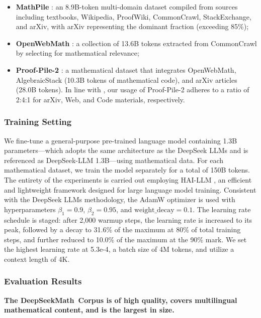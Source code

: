 \begin{itemize}[topsep=0pt]
\begin{itemize}[topsep=0pt]
    \item \textbf{MathPile} \citep{mathpile}: an 8.9B-token multi-domain dataset compiled from sources including textbooks, Wikipedia, ProofWiki, CommonCrawl, StackExchange, and arXiv, with arXiv representing the dominant fraction (exceeding 85\%);
    \item \textbf{OpenWebMath} \citep{openwebmath}: a collection of 13.6B tokens extracted from CommonCrawl by selecting for mathematical relevance;
    \item \textbf{Proof-Pile-2} \citep{llemma}: a mathematical dataset that integrates OpenWebMath, AlgebraicStack (10.3B tokens of mathematical code), and arXiv articles (28.0B tokens). In line with \cite{llemma}, our usage of Proof-Pile-2 adheres to a ratio of 2:4:1 for arXiv, Web, and Code materials, respectively.
\end{itemize}

\subsubsection{Training Setting}
\label{sec:quality-policy}
We fine-tune a general-purpose pre-trained language model containing 1.3B parameters—which adopts the same architecture as the DeepSeek LLMs \citep{deepseek-llm} and is referenced as DeepSeek-LLM 1.3B—using mathematical data. For each mathematical dataset, we train the model separately for a total of 150B tokens. The entirety of the experiments is carried out employing HAI-LLM \citep{haillm}, an efficient and lightweight framework designed for large language model training. Consistent with the DeepSeek LLMs methodology, the AdamW optimizer \citep{adamW} is used with hyperparameters $\beta_1=0.9$, $\beta_2=0.95$, and $\mathrm{weight\_decay}=0.1$. The learning rate schedule is staged: after 2,000 warmup steps, the learning rate is increased to its peak, followed by a decay to 31.6\% of the maximum at 80\% of total training steps, and further reduced to 10.0\% of the maximum at the 90\% mark. We set the highest learning rate at 5.3e-4, a batch size of 4M tokens, and utilize a context length of 4K.

\subsubsection{Evaluation Results}

\textbf{The DeepSeekMath~Corpus is of high quality, covers multilingual mathematical content, and is the largest in size.}


\end{itemize}
